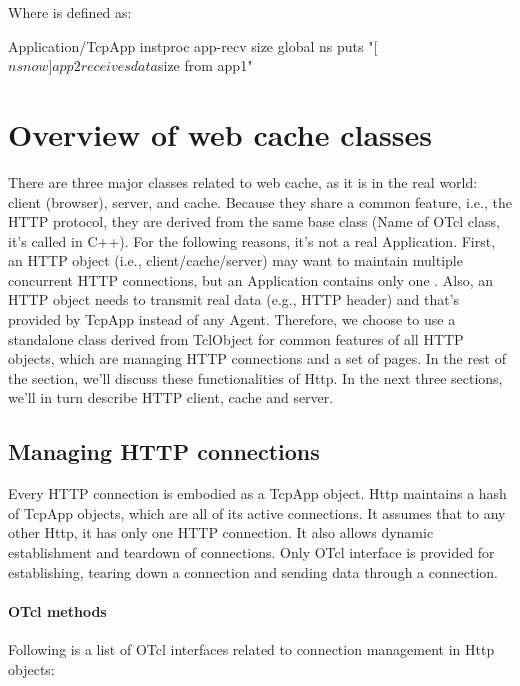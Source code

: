 Where  is defined as:

\begin{program}
        Application/TcpApp instproc app-recv { size } {
                global ns
                puts "[$ns now] app2 receives data $size from app1"
        }
\end{program}


\section{Overview of web cache classes}
\label{sec:webcache-class}

There are three major classes related to web cache, as it is in the
real world: client (browser), server, and cache. Because they share a
common feature, i.e., the HTTP protocol, they are derived from the
same base class  (Name of OTcl class, it's called
 in C++). For the following reasons, it's not a real
Application.  First, an HTTP object (i.e., client/cache/server) may
want to maintain multiple concurrent HTTP connections, but an
Application contains only one .  Also, an HTTP object
needs to transmit real data (e.g., HTTP header) and that's provided by
TcpApp instead of any Agent. Therefore, we choose to use a standalone
class derived from TclObject for common features of all HTTP objects,
which are managing HTTP connections and a set of pages.  In the rest
of the section, we'll discuss these functionalities of Http. In the
next three sections, we'll in turn describe HTTP client, cache and
server.

\subsection{Managing HTTP connections}
\label{sec:webcache-connection}

Every HTTP connection is embodied as a TcpApp
object. Http maintains a hash of TcpApp objects, which are all of 
its active connections. It assumes that to any other Http, it 
has only one HTTP connection. It also allows dynamic establishment and 
teardown of connections. Only OTcl interface is provided for establishing,
tearing down a connection and sending data through a connection.

\paragraph{OTcl methods}
Following is a list of OTcl interfaces related to connection management 
in Http objects:

